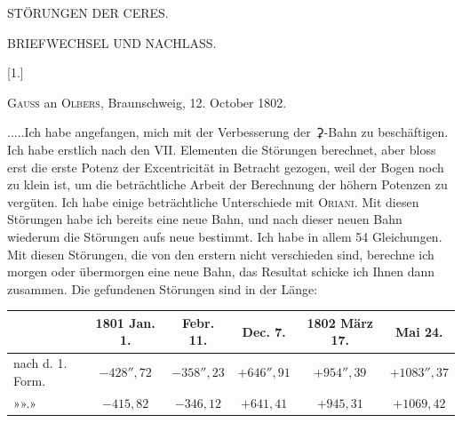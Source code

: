 \clearpage
\thispagestyle{empty}
\vspace*{1.6in}
\begin{center}{\Large STÖRUNGEN DER CERES.\par}\end{center}
\clearpage
{}
\begin{center}
{\large BRIEFWECHSEL UND NACHLASS.\par}
\par
[OCTOBER—DECEMBER 1802.]\par
\bigskip
{}[1.]\par
\medskip
\textsc{Gauss} an \textsc{Olbers}, Braunschweig, 12. October 1802.
\end{center}
\noindent\hspace*{\parindent}.\quad.\quad.\quad.\quad.\quad Ich habe angefangen, mich mit der Verbesserung der {\AstroSymbols ⚳}-Bahn zu beschäftigen. Ich habe erstlich nach den VII. Elementen die Störungen berechnet, aber bloss erst die erste Potenz der Excentricität in Betracht gezogen, weil der Bogen noch zu klein ist, um die beträchtliche Arbeit der Berechnung der höhern Potenzen zu vergüten. Ich habe einige beträchtliche Unterschiede mit \textsc{Oriani}. Mit diesen Störungen habe ich bereits eine neue Bahn, und nach dieser neuen Bahn wiederum die Störungen aufs neue bestimmt. Ich habe in allem 54 Gleichungen. Mit diesen Störungen, die von den erstern nicht  verschieden sind, berechne ich morgen oder übermorgen eine neue Bahn, das Resultat schicke ich Ihnen dann zusammen. Die gefundenen Störungen sind in der Länge:
\begin{center}
\begingroup\footnotesize\setlength{\tabcolsep}{4pt}\renewcommand{\arraystretch}{1.25}
\begin{tabular}{l|c|c|c|c|c}
 & 1801 Jan. 1. & Febr. 11. & Dec. 7. & 1802 März 17. & Mai 24.\\
\hline
nach d. 1. Form. & \(-428''{,}72\) & \(-358''{,}23\) & \(+646''{,}91\) & \(+954''{,}39\) & \(+1083''{,}37\)\\
»\quad »\quad 2.\quad » & \(-415{,}82\) & \(-346{,}12\) & \(+641{,}41\) & \(+945{,}31\) & \(+1069{,}42\)\\
\end{tabular}\endgroup
\end{center}
